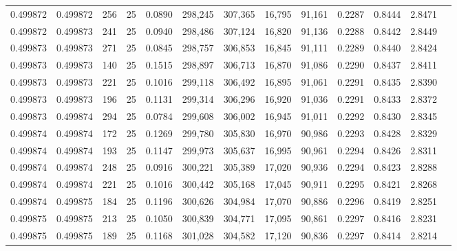 \begin{tabular}{rrrrrrrrrrrrr}
0.499872 & 0.499872 &   256 &  25 &                                     0.0890 & 298,245 & 307,365 &  16,795 &  91,161 & 0.2287 & 0.8444 & 2.8471 \\
0.499872 & 0.499873 &   241 &  25 &                                     0.0940 & 298,486 & 307,124 &  16,820 &  91,136 & 0.2288 & 0.8442 & 2.8449 \\
0.499873 & 0.499873 &   271 &  25 &                                     0.0845 & 298,757 & 306,853 &  16,845 &  91,111 & 0.2289 & 0.8440 & 2.8424 \\
0.499873 & 0.499873 &   140 &  25 &                                     0.1515 & 298,897 & 306,713 &  16,870 &  91,086 & 0.2290 & 0.8437 & 2.8411 \\
0.499873 & 0.499873 &   221 &  25 &                                     0.1016 & 299,118 & 306,492 &  16,895 &  91,061 & 0.2291 & 0.8435 & 2.8390 \\
0.499873 & 0.499873 &   196 &  25 &                                     0.1131 & 299,314 & 306,296 &  16,920 &  91,036 & 0.2291 & 0.8433 & 2.8372 \\
0.499873 & 0.499874 &   294 &  25 &                                     0.0784 & 299,608 & 306,002 &  16,945 &  91,011 & 0.2292 & 0.8430 & 2.8345 \\
0.499874 & 0.499874 &   172 &  25 &                                     0.1269 & 299,780 & 305,830 &  16,970 &  90,986 & 0.2293 & 0.8428 & 2.8329 \\
0.499874 & 0.499874 &   193 &  25 &                                     0.1147 & 299,973 & 305,637 &  16,995 &  90,961 & 0.2294 & 0.8426 & 2.8311 \\
0.499874 & 0.499874 &   248 &  25 &                                     0.0916 & 300,221 & 305,389 &  17,020 &  90,936 & 0.2294 & 0.8423 & 2.8288 \\
0.499874 & 0.499874 &   221 &  25 &                                     0.1016 & 300,442 & 305,168 &  17,045 &  90,911 & 0.2295 & 0.8421 & 2.8268 \\
0.499874 & 0.499875 &   184 &  25 &                                     0.1196 & 300,626 & 304,984 &  17,070 &  90,886 & 0.2296 & 0.8419 & 2.8251 \\
0.499875 & 0.499875 &   213 &  25 &                                     0.1050 & 300,839 & 304,771 &  17,095 &  90,861 & 0.2297 & 0.8416 & 2.8231 \\
0.499875 & 0.499875 &   189 &  25 &                                     0.1168 & 301,028 & 304,582 &  17,120 &  90,836 & 0.2297 & 0.8414 & 2.8214 \\

\end{tabular}
